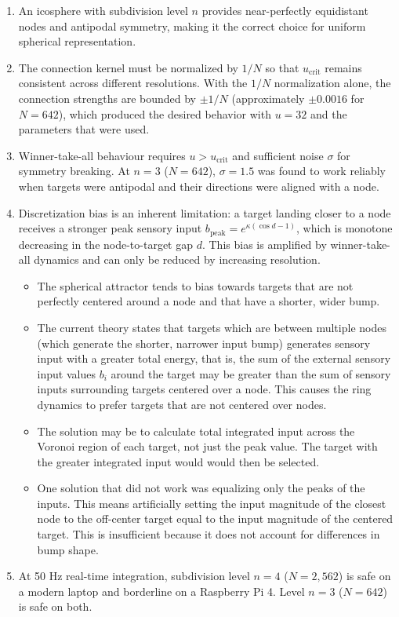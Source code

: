 \documentclass[12pt, letterpaper]{article}
\begin{document}
\begin{enumerate}
    \item An icosphere with subdivision level $n$ provides near-perfectly equidistant nodes and antipodal symmetry, making it the correct choice for uniform spherical representation.

    \item The connection kernel must be normalized by $1/N$ so that $u_{\text{crit}}$ remains consistent across different resolutions. With the $1/N$ normalization alone, the connection strengths are bounded by $\pm 1/N$ (approximately $\pm 0.0016$ for $N = 642$), which produced the desired behavior with $u = 32$ and the parameters that were used.

    \item Winner-take-all behaviour requires $u > u_{\text{crit}}$ and sufficient noise $\sigma$ for symmetry breaking. At $n=3$ ($N=642$), $\sigma = 1.5$ was found to work reliably when targets were antipodal and their directions were aligned with a node.

    \item Discretization bias is an inherent limitation: a target landing closer to a node receives a stronger peak sensory input $b_{\text{peak}} = e^{\kappa(\cos d - 1)}$, which is monotone decreasing in the node-to-target gap $d$. This bias is amplified by winner-take-all dynamics and can only be reduced by increasing resolution.
    \begin{itemize}
        \item The spherical attractor tends to bias towards targets that are not perfectly centered around a node and that have a shorter, wider bump.
        \item The current theory states that targets which are between multiple nodes (which generate the shorter, narrower input bump) generates sensory input with a greater total energy, that is, the sum of the external sensory input values $b_i$ around the target may be greater than the sum of sensory inputs surrounding targets centered over a node. This causes the ring dynamics to prefer targets that are not centered over nodes.
        \item The solution may be to calculate total integrated input across the Voronoi region of each target, not just the peak value. The target with the greater integrated input would would then be selected. 
        \item One solution that did not work was equalizing only the peaks of the inputs. This means artificially setting the input magnitude of the closest node to the off-center target equal to the input magnitude of the centered target. This is insufficient because it does not account for differences in bump shape.
    \end{itemize}

    \item At 50 Hz real-time integration, subdivision level $n=4$ ($N=2{,}562$) is safe on a modern laptop and borderline on a Raspberry Pi 4. Level $n=3$ ($N=642$) is safe on both.
\end{enumerate}
\end{document}
